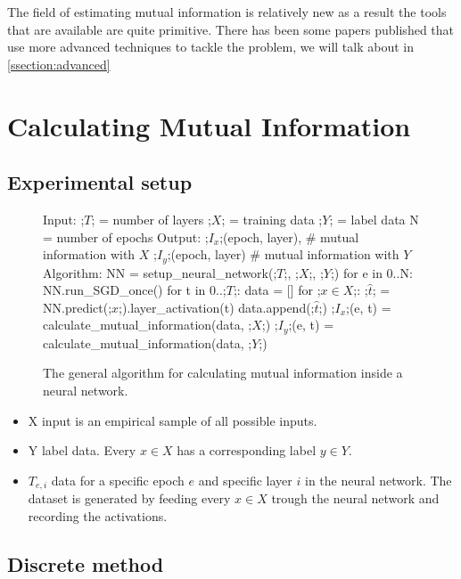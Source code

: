 The field of estimating mutual information is relatively new as a result the
tools that are available are quite primitive. There has been some papers
published that use more advanced techniques to tackle the problem, we will talk
about in \autoref{ssection:advanced}

\section{Calculating Mutual Information}

\subsection{Experimental setup}

\begin{figure}[H]
    \begin{pythonfigure}
      Input:
      ;$T$; = number of layers
      ;$X$; = training data
      ;$Y$; = label data
      N = number of epochs
      Output: 
      ;$I_x$;(epoch, layer), # mutual information with $X$ 
      ;$I_y$;(epoch, layer)  # mutual information with $Y$ 
      Algorithm:
      NN = setup_neural_network(;$T$;, ;$X$;, ;$Y$;)
      for e in 0..N:
        NN.run_SGD_once()
        for t in 0..;$T$;:
          data = []
          for ;$x \in X$;:
            ;$\hat{t}$; = NN.predict(;$x$;).layer_activation(t)
            data.append(;$\hat{t}$;)
          ;$I_x$;(e, t) = calculate_mutual_information(data, ;$X$;)
          ;$I_y$;(e, t) = calculate_mutual_information(data, ;$Y$;)
    \end{pythonfigure}
    \caption{The general algorithm for calculating mutual information inside a
    neural network.}
    \label{fig:general}
\end{figure}

\begin{itemize}
  \item{
      X input is an empirical sample of all possible inputs.
    }
  \item{
      Y label data. Every $x \in X$ has a corresponding label $y \in Y$. 
    }
  \item{
      $T_{e,i}$ data for a specific epoch $e$ and specific layer $i$ in the
      neural network. The dataset is  generated by feeding every $x \in X$
      trough the neural network and recording the activations.
    }
\end{itemize}

\newpage

\subsection{Discrete method} 

